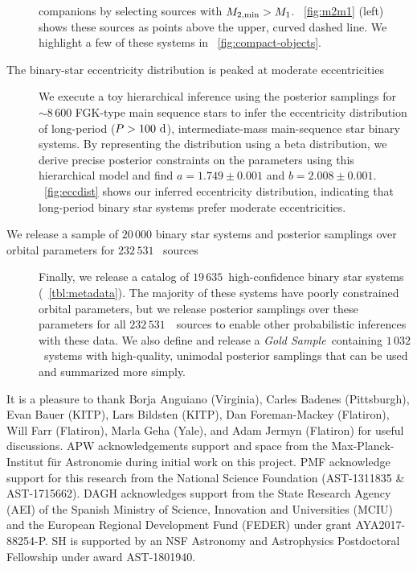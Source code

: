 \documentclass[modern]{aastex63}
\newcommand{\nsources}{\ensuremath{232\,531}}
\newcommand{\nbinary}{\ensuremath{19\,635}}
\newcommand{\goldsample}{\textit{Gold Sample}}
\newcommand{\ngold}{\ensuremath{1\,032}}
\begin{document}
\begin{description}
    companions by selecting sources with $M_{2, {\rm min}} > M_1$.
    \figurename~\ref{fig:m2m1} (left) shows these sources as points above the
    upper, curved dashed line. We highlight a few of these systems in
    \figurename~\ref{fig:compact-objects}.
    \item[The binary-star eccentricity distribution is peaked at
    moderate eccentricities] We execute a toy hierarchical inference using the
    posterior samplings for $\sim 8\,600$ FGK-type main sequence stars to infer
    the eccentricity distribution of long-period ($P>100~\mathrm{d}$),
    intermediate-mass main-sequence star binary systems. By representing the
    distribution using a beta distribution, we derive precise posterior
    constraints on the parameters using this hierarchical model and find $a =
    1.749 \pm 0.001$ and $b = 2.008 \pm 0.001$. \figurename~\ref{fig:eccdist}
    shows our inferred eccentricity distribution, indicating that long-period
    binary star systems prefer moderate eccentricities.
    \item[We release a sample of $20\,000$ binary star systems and posterior
    samplings over orbital parameters for $\nsources$ \apogee\ sources] Finally,
    we release a catalog of \nbinary\ high-confidence binary star systems
    (\tablename~\ref{tbl:metadata}). The majority of these systems have poorly
    constrained orbital parameters, but we release posterior samplings over
    these parameters for all \nsources\ \apogee\ sources to enable other
    probabilistic inferences with these data. We also define and release a
    \goldsample\ containing \ngold\ systems with high-quality, unimodal
    posterior samplings that can be used and summarized more simply.
\end{description}


\acknowledgements

It is a pleasure to thank
Borja Anguiano (Virginia),
Carles Badenes (Pittsburgh),
Evan Bauer (KITP),
Lars Bildsten (KITP),
Dan Foreman-Mackey (Flatiron),
Will Farr (Flatiron),
Marla Geha (Yale),
and Adam Jermyn (Flatiron) for useful discussions.
APW acknowledgements support and space from the Max-Planck-Institut f\"ur
Astronomie during initial work on this project.
PMF acknowledge support for this research from the National Science Foundation
(AST-1311835 \& AST-1715662).
DAGH acknowledges support from the State Research Agency (AEI) of the Spanish
Ministry of Science, Innovation and Universities (MCIU) and the European
Regional Development Fund (FEDER) under grant AYA2017-88254-P.
SH is supported by an NSF Astronomy and Astrophysics Postdoctoral Fellowship
under award AST-1801940.
\end{document}
